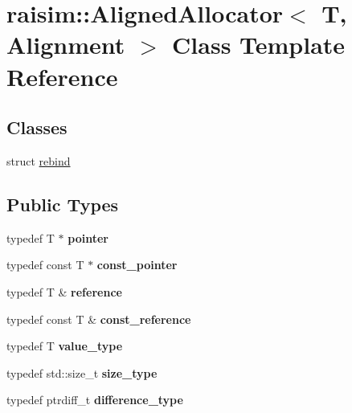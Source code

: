 \hypertarget{classraisim_1_1AlignedAllocator}{}\section{raisim\+:\+:Aligned\+Allocator$<$ T, Alignment $>$ Class Template Reference}
\label{classraisim_1_1AlignedAllocator}
\subsection*{Classes}
\begin{DoxyCompactItemize}
\item 
struct \hyperlink{structraisim_1_1AlignedAllocator_1_1rebind}{rebind}
\end{DoxyCompactItemize}
\subsection*{Public Types}
\begin{DoxyCompactItemize}
\item 
\mbox{\label{classraisim_1_1AlignedAllocator_a6b76f320a074be5654aae7a62e159211}} 
typedef T $\ast$ {\bfseries pointer}
\item 
\mbox{\label{classraisim_1_1AlignedAllocator_a9cad8b06723186d7b4dd070cc6b80d3c}} 
typedef const T $\ast$ {\bfseries const\+\_\+pointer}
\item 
\mbox{\label{classraisim_1_1AlignedAllocator_abb0b5bc4801ffbdd39f09ac00da18128}} 
typedef T \& {\bfseries reference}
\item 
\mbox{\label{classraisim_1_1AlignedAllocator_a875049113ca699d473561231dd89eaa7}} 
typedef const T \& {\bfseries const\+\_\+reference}
\item 
\mbox{\label{classraisim_1_1AlignedAllocator_a55c8f86a15bca27431ec9d2928a9b6a8}} 
typedef T {\bfseries value\+\_\+type}
\item 
\mbox{\label{classraisim_1_1AlignedAllocator_a36d36756457a445bb6f771ce2fcd0036}} 
typedef std\+::size\+\_\+t {\bfseries size\+\_\+type}
\item 
\mbox{\label{classraisim_1_1AlignedAllocator_a35984f9dae42e8441ef5b2b2f1cbbe8a}} 
typedef ptrdiff\+\_\+t {\bfseries difference\+\_\+type}
\end{DoxyCompactItemize}
